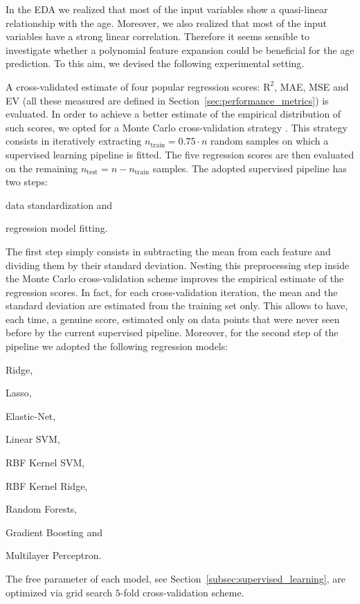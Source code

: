 In the EDA we realized that most of the input variables show a quasi-linear relationship with the age. Moreover, we also realized that most of the input variables have a strong linear correlation. Therefore it seems sensible to investigate whether a polynomial feature expansion could be beneficial for the age prediction.
To this aim, we devised the following experimental setting.

A cross-validated estimate of four popular regression scores: $\text{R}^2$, MAE, MSE and EV (all these measured are defined in Section~\ref{sec:performance_metrics}) is evaluated.
In order to achieve a better estimate of the empirical distribution of such scores, we opted for a Monte Carlo cross-validation strategy .
This strategy consists in iteratively extracting $n_{\text{train}} = 0.75 \cdot n$ random samples on which a supervised learning pipeline is fitted.
The five regression scores are then evaluated on the remaining $n_{\text{test}} = n - n_{\text{train}}$ samples.
The adopted supervised pipeline has two steps:
\begin{enumerate*}[label=(\roman*)]
	\item data standardization and
	\item regression model fitting.
\end{enumerate*}
The first step simply consists in subtracting the mean from each feature and dividing them by their standard deviation. Nesting this preprocessing step inside the Monte Carlo cross-validation scheme improves the empirical estimate of the regression scores. In fact, for each cross-validation iteration, the mean and the standard deviation are estimated from the training set only. This allows to have, each time, a genuine score, estimated only on data points that were never seen before by the current supervised pipeline.
Moreover, for the second step of the pipeline we adopted the following regression models:
\begin{enumerate*}[label=(\alph*)]
	\item Ridge,
	\item Lasso,
	\item Elastic-Net,
	\item Linear SVM,
	\item RBF Kernel SVM,
	\item RBF Kernel Ridge,
	\item Random Forests,
	\item Gradient Boosting and
	\item Multilayer Perceptron.
\end{enumerate*}
The free parameter of each model, see Section~\ref{subsec:supervised_learning}, are optimized via grid search $5$-fold cross-validation scheme.

